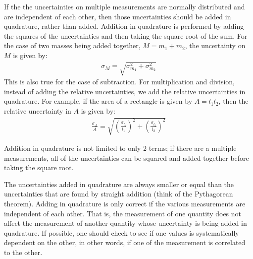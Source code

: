 If the the uncertainties on multiple measurements are normally distributed and are independent of each other, then those uncertainties should be added in quadrature, rather than added. Addition in quadrature is performed by adding the squares of the uncertainties and then taking the square root of the sum. For the case of two masses being added together, $M=m_1+m_2$, the uncertainty on $M$ is given by:
\begin{align}
\sigma_{M} = \sqrt{\sigma_{m_1}^2+\sigma_{m_2}^2}
\end{align}
This is also true for the case of subtraction. For multiplication and division, instead of adding the relative uncertainties, we add the relative uncertainties in quadrature. For example, if the area of a rectangle is given by $A=l_1l_2$, then the relative uncertainty in $A$ is given by:
\begin{align}
\frac{\sigma_{A}}{A}=\sqrt{\left(\frac{\sigma_{l_1}}{l_1}\right)^2+\left(\frac{\sigma_{l_2}}{l_2}\right)^2}
\end{align}

Addition in quadrature is not limited to only 2 terms; if there are a multiple measurements, all of the uncertainties can be squared and added together before taking the square root.

The uncertainties added in quadrature are always smaller or equal than the uncertainties that are found by straight addition (think of the Pythagorean theorem). Adding in quadrature is only correct if the various measurements are independent of each other. That is, the measurement of one quantity does not affect the measurement of another quantity whose uncertainty is being added in quadrature. If possible, one should check to see if one values is systematically dependent on the other, in other words, if one of the measurement is correlated to the other.


